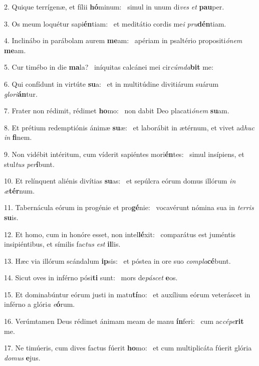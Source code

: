 2. Quique terrígenæ, et fílii \textbf{hó}minum: \ast\  simul in unum di\textit{ves} \textit{et} \textbf{pau}per.\

3. Os meum loquétur sapi\textbf{én}tiam: \ast\  et meditátio cordis me\textit{i} \textit{pru}\textbf{dén}tiam.\

4. Inclinábo in parábolam aurem \textbf{me}am: \ast\  apériam in psaltério propositi\textit{ó}\textit{nem} \textbf{me}am.\

5. Cur timébo in die \textbf{ma}la? \ast\  iníquitas calcánei mei cir\textit{cúm}\textit{da}\textbf{bit} me:\

6. Qui confídunt in virtúte \textbf{su}a: \ast\  et in multitúdine divitiárum suárum \textit{glo}\textit{ri}\textbf{án}tur.\

7. Frater non rédimit, rédimet \textbf{ho}mo: \ast\  non dabit Deo placati\textit{ó}\textit{nem} \textbf{su}am.\

8. Et prétium redemptiónis ánimæ \textbf{su}æ: \ast\  et laborábit in ætérnum, et vivet ad\textit{huc} \textit{in} \textbf{fi}nem.\

9. Non vidébit intéritum, cum víderit sapiéntes mori\textbf{én}tes: \ast\  simul insípiens, et stul\textit{tus} \textit{per}\textbf{í}bunt.\

10. Et relínquent aliénis divítias \textbf{su}as: \ast\  et sepúlcra eórum domus illórum \textit{in} \textit{æ}\textbf{tér}num.\

11. Tabernácula eórum in progénie et pro\textbf{gé}nie: \ast\  vocavérunt nómina sua in \textit{ter}\textit{ris} \textbf{su}is.\

12. Et homo, cum in honóre esset, non intel\textbf{lé}xit: \ast\  comparátus est juméntis insipiéntibus, et símilis fac\textit{tus} \textit{est} \textbf{il}lis.\

13. Hæc via illórum scándalum \textbf{ip}sis: \ast\  et póstea in ore suo \textit{com}\textit{pla}\textbf{cé}bunt.\

14. Sicut oves in inférno pósi\textbf{ti} sunt: \ast\  mors de\textit{pá}\textit{scet} \textbf{e}os.\

15. Et dominabúntur eórum justi in matu\textbf{tí}no: \ast\  et auxílium eórum veteráscet in inférno a glóri\textit{a} \textit{e}\textbf{ó}rum.\

16. Verúmtamen Deus rédimet ánimam meam de manu \textbf{ín}feri: \ast\  cum ac\textit{cé}\textit{pe}\textbf{rit} me.\

17. Ne timúeris, cum dives factus fúerit \textbf{ho}mo: \ast\  et cum multiplicáta fúerit glória \textit{do}\textit{mus} \textbf{e}jus.\

